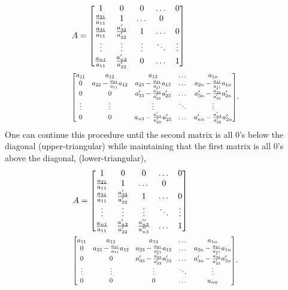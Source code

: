 \documentclass[twocolumn]{article}
\begin{document}
\begin{align*}
  &A=\begin{bmatrix} 1  & 0  &  0 &  \dots  & 0 \\
    \frac{a_{21}}{a_{11}} & 1  & \dots  &   0  \\
    \frac{a_{31}}{a_{11}} & \frac{a'_{32}}{a'_{22}}  & 1 & \dots  &   0  \\
    \vdots  & \vdots &  \vdots  &   \ddots  &  \vdots   \\
    \frac{a_{n1}}{a_{11}} & \frac{a'_{n2}}{a'_{22}} &  0   &  \dots  & 1
  \end{bmatrix}  \\
  &  \scalebox{0.8}{\mbox{$\begin{bmatrix}
        a_{11} & a_{12}  &  a_{13} &     \dots &  a_{1n} \\
        0 & a_{22}-\frac{a_{21}}{a_{11}}a_{12}  & a_{23}-\frac{a_{21}}{a_{11}}a_{13} &  \dots &  a_{2n} -\frac{a_{21}}{a_{11}}a_{1n}\\
        0 & 0 &  a'_{33}-\frac{a'_{32}}{a'_{22}}a'_{23} &     \dots &  a'_{3n}-\frac{a'_{32}}{a'_{22}}a'_{2n} \\
        \vdots &  \vdots  & \vdots &  \ddots & \vdots \\
        0 & 0  &  a_{n3} -\frac{a'_{n1}}{a'_{22}}a'_{23}&   \dots &  a'_{nn}-\frac{a'_{n2}}{a'_{22}}a'_{2n}
      \end{bmatrix}$}}.
\end{align*}
% 
One can  continue this  procedure  until  the second matrix  is all  0's  below
the  diagonal (upper-triangular)   while  maintaining  that  the  first matrix
is  all  0's above the  diagonal, (lower-triangular),
% 
\begin{align*}
  &A=\begin{bmatrix} 1  & 0  &  0 &  \dots  & 0 \\
    \frac{a_{21}}{a_{11}} & 1  & \dots  &   0  \\
    \frac{a_{31}}{a_{11}} & \frac{a'_{32}}{a'_{22}}  & 1 & \dots  &   0  \\
    \vdots  & \vdots &  \vdots  &   \ddots  &  \vdots   \\
    \frac{a_{n1}}{a_{11}} & \frac{a'_{n2}}{a'_{22}} &  \frac{a''_{n3}}{a''_{n3}}   &  \dots  & 1
  \end{bmatrix}  \\
  &  \scalebox{0.8}{\mbox{$\begin{bmatrix}
        a_{11} & a_{12}  &  a_{13} &     \dots &  a_{1n} \\
        0 & a_{22}-\frac{a_{21}}{a_{11}}a_{12}  & a_{23}-\frac{a_{21}}{a_{11}}a_{13} &  \dots &  a_{2n} -\frac{a_{21}}{a_{11}}a_{1n}\\
        0 & 0 &  a'_{33}-\frac{a'_{32}}{a'_{22}}a'_{23} &     \dots &  a'_{3n}-\frac{a'_{32}}{a'_{22}}a'_{2n} \\
        \vdots &  \vdots  & \vdots &  \ddots & \vdots \\
        0 & 0  &  0&   \dots &  u_{nn}
      \end{bmatrix}$}}.
\end{align*}
\end{document}
